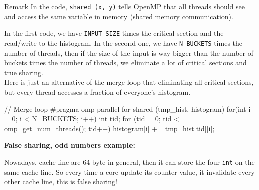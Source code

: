    \begin{remark}{Remark}
        In the code, \lstinline!shared (x, y)! tells OpenMP that all threads should see and access the same variable in memory (shared memory communication).
    \end{remark}
    In the first code, we have \lstinline!INPUT_SIZE! times the critical section and the read/write to the histogram. In the second one, we have \lstinline!N_BUCKETS! times the number of threads, then if the size of the input is way bigger than the number of buckets times the number of threads, we eliminate a lot of critical sections and true sharing. \\
    Here is just an alternative of the merge loop that eliminating all critical sections, but every thread accesses a fraction of everyone's histogram.
        \begin{codeCenter}
        \begin{Ccode}
// Merge loop
#pragma omp parallel for shared (tmp_hist, histogram)
for(int i = 0; i < N_BUCKETS; i++) {
    int tid;
    for (tid = 0; tid < omp_get_num_threads(); tid++) {
        histogram[i] += tmp_hist[tid][i];
    }
}
        \end{Ccode}
        \end{codeCenter}


    \textbf{False sharing, odd numbers example:}
    \begin{codeCenter}
    \end{codeCenter}
    \begin{tcolorbox}[gris]
        Nowadays, cache line are 64 byte in general, then it can store the four \lstinline!int! on the same cache line. So every time a core update its counter value, it invalidate every other cache line, this is false sharing!
    \end{tcolorbox}
    
